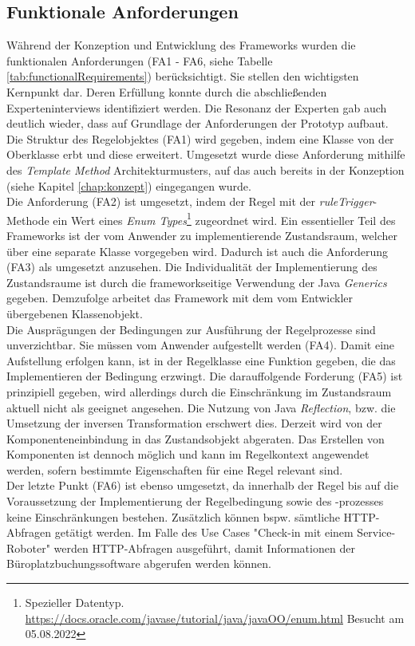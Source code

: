     \subsection*{Funktionale Anforderungen}
        Während der Konzeption und Entwicklung des Frameworks wurden die funktionalen Anforderungen (FA1 - FA6, siehe Tabelle \ref{tab:functionalRequirements}) 
        berücksichtigt. Sie stellen den wichtigsten Kernpunkt dar. Deren Erfüllung konnte durch die abschließenden 
        Experteninterviews identifiziert werden. Die Resonanz der Experten gab auch deutlich wieder, dass auf Grundlage der Anforderungen der Prototyp aufbaut. Die Struktur 
        des Regelobjektes (FA1) wird gegeben, indem eine Klasse von der Oberklasse erbt und diese erweitert. Umgesetzt wurde diese Anforderung mithilfe des 
        \textit{Template Method} Architekturmusters, auf das auch bereits in der Konzeption (siehe Kapitel \ref{chap:konzept}) eingegangen wurde. 
        \\
        \linebreak
        Die Anforderung (FA2) ist 
        umgesetzt, indem der Regel mit der \textit{ruleTrigger}-Methode ein Wert eines \textit{Enum Types}\footnote{Spezieller Datentyp. \url{https://docs.oracle.com/javase/tutorial/java/javaOO/enum.html} Besucht am 05.08.2022} 
        zugeordnet wird. Ein essentieller Teil des Frameworks ist der vom Anwender zu implementierende Zustandsraum, welcher über eine separate Klasse vorgegeben wird. Dadurch 
        ist auch die Anforderung (FA3) als umgesetzt anzusehen. Die Individualität der Implementierung des Zustandsraume ist durch die frameworkseitige Verwendung der 
        Java \textit{Generics} gegeben. Demzufolge arbeitet das Framework mit dem vom Entwickler übergebenen Klassenobjekt. 
        \\
        \linebreak
        Die Ausprägungen der Bedingungen zur Ausführung der Regelprozesse sind unverzichtbar. Sie müssen vom Anwender aufgestellt werden (FA4). Damit eine Aufstellung erfolgen kann, ist in der Regelklasse eine 
        Funktion gegeben, die das Implementieren der Bedingung erzwingt. 
        Die darauffolgende Forderung (FA5) ist prinzipiell gegeben, wird allerdings durch die Einschränkung im 
        Zustandsraum aktuell nicht als geeignet angesehen. Die Nutzung von Java \textit{Reflection}, bzw. die Umsetzung der inversen Transformation erschwert dies. Derzeit wird von der Komponenteneinbindung 
        in das Zustandsobjekt abgeraten. Das Erstellen von Komponenten ist dennoch möglich und kann im Regelkontext angewendet werden, sofern bestimmte Eigenschaften für eine Regel relevant sind. 
        \\
        \linebreak
        Der letzte Punkt (FA6) ist ebenso umgesetzt, da innerhalb der Regel bis auf die Voraussetzung der Implementierung der Regelbedingung sowie des -prozesses keine Einschränkungen bestehen. 
        Zusätzlich können bspw. sämtliche \acs{HTTP}-Abfragen getätigt werden. Im Falle des Use Cases "Check-in mit einem Service-Roboter" werden \acs{HTTP}-Abfragen ausgeführt, damit 
        Informationen der Büroplatzbuchungssoftware abgerufen werden können. 

